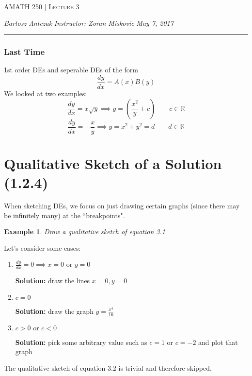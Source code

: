 \documentclass{report}
\newcommand{\lectureNum}{3}
\newcommand{\curDate}{May 7, 2017}
\newcommand{\course}{AMATH 250}
\newcommand{\instructor}{Zoran Miskovic}
\newtheorem{ex}{Example}[section]
\begin{document}
\begin{center}
\begin{Large}
\textsc{\course{} | Lecture \lectureNum{}}
\end{Large}
\end{center} 
\noindent \textit{Bartosz Antczak} \hfill
\textit{Instructor: \instructor{}} \hfill
\textit{\curDate{}}
\rule{\textwidth}{0.4pt}
\subsubsection{Last Time}
1st order DEs and seperable DEs of the form
$$\frac{dy}{dx} = A(x) B(y)$$
We looked at two examples:
\begin{equation}
    \frac{dy}{dx} = x\sqrt{y} \implies y = \left(\frac{x^2}{y} + c\right) \qquad c \in \mathbb{R}
\end{equation}
\begin{equation}
    \frac{dy}{dx} = -\frac{x}{y} \implies y = x^2 + y^2 = d \qquad d \in \mathbb{R}
\end{equation}
\section{Qualitative Sketch of a Solution (1.2.4)}
When sketching DEs, we focus on just drawing certain graphs (since there may be infinitely many) at the ``breakpoints".
\begin{ex}
Draw a qualitative sketch of equation 3.1
\end{ex}
Let's consider some cases:
\begin{enumerate}
    \item $\frac{dy}{dx} = 0 \implies x = 0 \text{ or } y = 0$
        
    \vspace{0.0cm}
    \textbf{Solution:} draw the lines $x = 0, y = 0$
    \item $c = 0$
        
    \vspace{0.0cm}
    \textbf{Solution:} draw the graph $y = \frac{x^4}{16}$
    \item $c > 0 \text { or } c < 0$
        
    \vspace{0.0cm}
    \textbf{Solution:} pick some arbitrary value such as $c = 1$ or $c = -2$ and plot that graph
\end{enumerate}
The qualitative sketch of equation 3.2 is trivial and therefore skipped.
\end{document}
